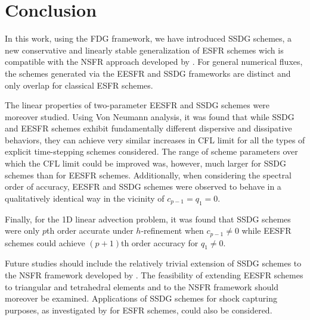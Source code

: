 \documentclass[preprint,12pt]{elsarticle}
\begin{document}
\section{Conclusion}
In this work, using the FDG framework, we have introduced SSDG schemes, a new conservative and linearly stable generalization of ESFR schemes wich is compatible with the NSFR approach developed by \cite{cicchino2022nonlinearly}. For general numerical fluxes, the schemes generated via the EESFR and SSDG frameworks are distinct and only overlap for classical ESFR schemes.

The linear properties of two-parameter EESFR and SSDG schemes were moreover studied. Using Von Neumann analysis, it was found that while SSDG and EESFR schemes exhibit fundamentally different dispersive and dissipative behaviors, they can achieve very similar increases in CFL limit for all the types of explicit time-stepping schemes considered. The range of scheme parameters over which the CFL limit could be improved was, however, much larger for SSDG schemes than for EESFR schemes. Additionally, when considering the spectral order of accuracy, EESFR and SSDG schemes were observed to behave in a qualitatively identical way in the vicinity of $c_{p-1} = q_1 = 0$.

Finally, for the 1D linear advection problem, it was found that SSDG schemes were only $p$th order accurate under $h$-refinement when $c_{p-1} \neq 0$ while EESFR schemes could achieve $(p+1)$th order accuracy for $q_1 \neq 0$.

Future studies should include the relatively trivial extension of SSDG schemes to the NSFR framework developed by \cite{cicchino2022nonlinearly}. The feasibility of extending EESFR schemes to triangular and tetrahedral elements and to the NSFR framework should moreover be examined. Applications of SSDG schemes for shock capturing purposes, as investigated by \cite{shruthi2025investigation} for ESFR schemes, could also be considered.

\appendix
\end{document}
